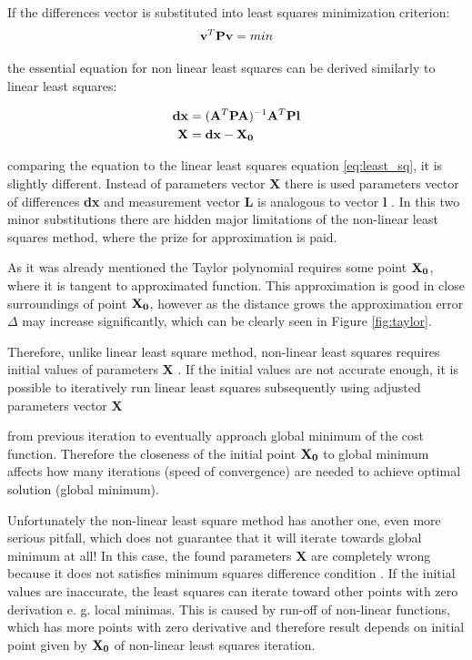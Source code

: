 \documentclass[a4paper,12pt]{article}
\newcommand{\ematr}[1]{
{\bf #1}
}
\newcommand{\evect}[1]{
{\bf #1}
}
\begin{document}
If the differences vector is substituted into least squares minimization criterion:
\begin{equation}
\label{eq:min_cond}
\evect{v}^{T}  \ematr{P} \evect{v} = min
\end{equation}

the essential equation for non linear least squares can be derived 
similarly to linear least squares:

\begin{equation}
\begin{split}
\label{eq:non_least_sq}
\evect{dx} &= (\ematr{A}^{T} \ematr{P} \ematr{A})^{-1} \ematr{A}^{T} \ematr{P} \ematr{l} \\
\evect{X} &=  {\evect{dx} -  \evect{X_{0}}} \\
\end{split}
\end{equation}

comparing the equation to the linear least squares equation \eqref{eq:least_sq},
 it is slightly different. Instead of parameters vector \evect{X} there is used 
parameters vector of differences \evect{dx} and measurement vector \evect{L} is analogous to vector \evect{l}. In this two minor 
substitutions there are hidden major limitations of the non-linear least squares method, 
where the prize for approximation is paid. 

As it was already mentioned the Taylor polynomial requires some point $\evect{X_{0}}$, where it is tangent to 
approximated function.
This approximation is good in close surroundings of point $\evect{X_{0}}$, however as the distance 
grows the approximation error $\Delta$ may increase significantly, which can be clearly seen in Figure \ref{fig:taylor}.

Therefore, unlike linear least square method, non-linear least squares requires initial 
values of parameters \evect{X}. If the initial values are not accurate 
enough, it is possible to iteratively run linear least squares subsequently using adjusted parameters vector \evect{X}
from previous iteration to eventually approach global minimum of the cost function. 
Therefore the closeness of the initial point $\evect{X_{0}}$ to global minimum affects how many iterations (speed of convergence)
are needed to achieve optimal solution (global minimum).

Unfortunately the non-linear least square method has another one, even more serious pitfall, which 
does not guarantee that it will iterate towards global minimum at all!
In this case, the found parameters \evect{X} are completely wrong because 
it does not satisfies minimum squares difference condition \label{eq:min_cond}. If the initial values are 
inaccurate, the least squares can iterate toward other points with zero derivation e. g. local minimas.  
This is caused by run-off of non-linear functions, which has more points with zero derivative
and therefore result depends on initial point given by $\evect{X_{0}}$  of non-linear least squares iteration.
\end{document}
